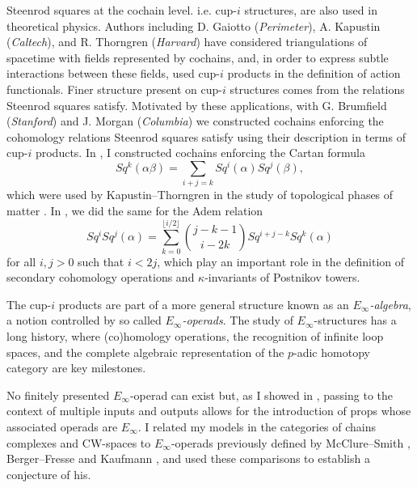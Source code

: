 Steenrod squares at the cochain level. i.e. cup-$i$ structures, are also used in theoretical physics. Authors including D. Gaiotto (\textit{Perimeter}), A. Kapustin (\textit{Caltech}), and R. Thorngren (\textit{Harvard}) have considered triangulations of spacetime with fields represented by cochains, and, in order to express subtle interactions between these fields, used cup-$i$ products in the definition of action functionals.
Finer structure present on cup-$i$ structures comes from the relations Steenrod squares satisfy.
Motivated by these applications, with G. Brumfield (\textit{Stanford}) and J. Morgan (\textit{Columbia}) we constructed cochains enforcing the cohomology relations Steenrod squares satisfy using their description in terms of cup-$i$ products.
In \cite{medina2020cartan}, I constructed cochains enforcing the Cartan formula
\begin{equation*}
Sq^k(\alpha \beta) = \sum_{i+j=k} Sq^i(\alpha) Sq^j(\beta),
\end{equation*}
which were used by Kapustin--Thorngren in the study of topological phases of matter \cite{kapustin2017fermionic}.
In \cite{medina2021adem}, we did the same for the Adem relation
\begin{equation*}
Sq^i Sq^j(\alpha) = \sum_{k=0}^{\lfloor i/2 \rfloor} \binom{j-k-1}{i-2k} Sq^{i+j-k} Sq^k(\alpha)
\end{equation*}
for all $i,j > 0$ such that $i < 2j$, which play an important role in the definition of secondary cohomology operations and $\kappa$-invariants of Postnikov towers.

The cup-$i$ products are part of a more general structure known as an \textit{$E_\infty$-algebra}, a notion controlled by so called \textit{$E_\infty$-operads}.
The study of $E_\infty$-structures has a long history, where (co)homology operations, the recognition of infinite loop spaces, and the complete algebraic representation of the $p$-adic homotopy category are key milestones.

No finitely presented $E_\infty$-operad can exist but, as I showed in \cite{medina2020prop1, medina2018prop2}, passing to the context of multiple inputs and outputs allows for the introduction of props whose associated operads are $E_\infty$.
I related my models in the categories of chains complexes and CW-spaces to $E_\infty$-operads previously defined by McClure--Smith \cite{mcclure2003multivariable}, Berger--Fresse \cite{berger2004combinatorial} and Kaufmann \cite{kaufmann2009dimension}, and used these comparisons to establish a conjecture of his.

